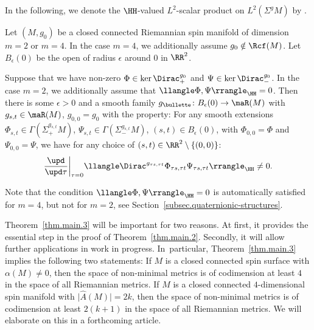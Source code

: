 In the following, we denote the $\HH$-valued $L^2$-scalar product on $L^2(\Sigma^gM)$ by \smash{$\llangle\biargu\rrangle_\HH$}.

\begin{Theorem} \label{thm.main.3}
 Let $(M,g_0)$ be a closed connected Riemannian spin manifold of dimension $m=2$ or $m=4$. In the case $m=4$, we additionally assume $g_0\notin \Rcf(M)$.
 Let $B_\epsilon(0)$ be the open \ball{} of radius $\epsilon$ around $0$ in $\RR^2$.

Suppose that we have non-zero $\Phi\in \ker \Dirac_+^{g_0}$ and $\Psi\in \ker\Dirac_-^{g_0}$. In the case $m=2$, we additionally assume that $\llangle\Phi,\Psi\rrangle_\HH=0$. Then there is some $\epsilon>0$ and a smooth family $g_{\bullette}\colon B_\epsilon(0)\to \maR(M)$ with $g_{s,t}\in \maR(M)$, $g_{0,0}=g_0$ with the property:
For any smooth extensions $\Phi_{s,t}\in \Gamma(\Sigma_+^{g_{s,t}}M)$, $\Psi_{s,t}\in \Gamma(\Sigma_-^{g_{s,t}}M)$, $(s,t)\in B_\epsilon(0)$, with $\Phi_{0,0}=\Phi$ and $\Psi_{0,0}=\Psi$, we have for any choice of $(s,t)\in \RR^2\setminus \{(0,0)\}$:
\[
\frac{\upd}{\upd \tau}\bigg|_{\tau=0}
\llangle\Dirac^{g_{\tau s,\tau t}}\Phi_{\tau s,\tau t} \Psi_{\tau s,\tau t}\rrangle_\HH
\neq 0 .
\]
\end{Theorem}

Note that the condition $\llangle\Phi,\Psi\rrangle_\HH=0$ is automatically satisfied for $m=4$, but not for $m=2$, see Section~\ref{subsec.quaternionic-structures}.

Theorem~\ref{thm.main.3} will be important for two reasons. At first, it provides the essential step in the proof of Theorem~\ref{thm.main.2}.
Secondly, it will allow further applications in work in progress. In~particular, Theorem~\ref{thm.main.3} implies the following two statements: If $M$ is a closed connected spin surface
with $\alpha(M)\neq 0$, then the space of non-minimal metrics is of codimension at least $4$ in the space of all Riemannian metrics. If $M$ is a closed connected $4$-dimensional spin manifold with $\bigl|\hat A(M)\bigr|=2k$, then the space of non-minimal metrics is of codimension at least $2(k+1)$ in the space of all Riemannian metrics. We will elaborate on this in a forthcoming article.

